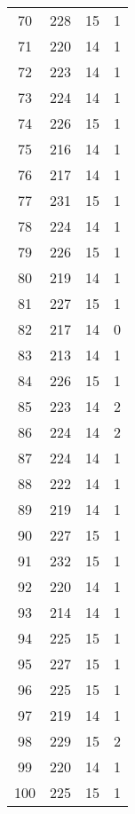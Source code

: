 \begin{longtable}[!]{c|ccc}
	70	& 228	& 15	& 1	\\
	71	& 220	& 14	& 1	\\
	72	& 223	& 14	& 1	\\
	73	& 224	& 14	& 1	\\
	74	& 226	& 15	& 1	\\
	75	& 216	& 14	& 1	\\
	76	& 217	& 14	& 1	\\
	77	& 231	& 15	& 1	\\
	78	& 224	& 14	& 1	\\
	79	& 226	& 15	& 1	\\
	80	& 219	& 14	& 1	\\
	81	& 227	& 15	& 1	\\
	82	& 217	& 14	& 0	\\
	83	& 213	& 14	& 1	\\
	84	& 226	& 15	& 1	\\
	85	& 223	& 14	& 2	\\
	86	& 224	& 14	& 2	\\
	87	& 224	& 14	& 1	\\
	88	& 222	& 14	& 1	\\
	89	& 219	& 14	& 1	\\
	90	& 227	& 15	& 1	\\
	91	& 232	& 15	& 1	\\
	92	& 220	& 14	& 1	\\
	93	& 214	& 14	& 1	\\
	94	& 225	& 15	& 1	\\
	95	& 227	& 15	& 1	\\
	96	& 225	& 15	& 1	\\
	97	& 219	& 14	& 1	\\
	98	& 229	& 15	& 2	\\
	99	& 220	& 14	& 1	\\
	100	& 225	& 15	& 1	\\
\end{longtable}


